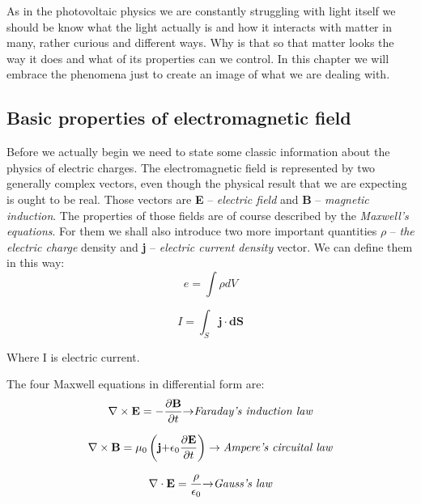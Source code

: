 As in the photovoltaic physics we are constantly struggling with light itself we should be know what the light actually is and how it interacts with matter in many, rather curious and different ways. Why is that so that matter looks the way it does and what of its properties can we control. In this chapter we will embrace the phenomena just to create an image of what we are dealing with. 

\subsection{Basic properties of electromagnetic field}

Before we actually begin we need to state some classic information about
the physics of electric charges. The electromagnetic field is
represented by two generally complex vectors, even though the physical
result that we are expecting is ought to be real. Those vectors are
\textbf{E} -- \emph{electric field} and \textbf{B} -- \emph{magnetic
induction}. The properties of those fields are of course described by
the \emph{Maxwell's equations}. For them we shall also introduce two
more important quantities \(\rho\) -- \emph{the electric charge} density
and \textbf{j} -- \emph{electric current density} vector.
We can define them in this way:
\begin{equation}
e = \int\rho dV
\end{equation}

\begin{equation}
I = \int_{S}^{}\mathbf{j \cdot dS}
\end{equation}

Where I is electric current.

The four Maxwell equations in differential form are:
\begin{equation}
\nabla \times \mathbf{E} = -\frac{\partial\mathbf{B}}{\partial t}\mathbf{\rightarrow}
\emph{Faraday's induction law}
\end{equation}

\begin{equation}
\nabla \times \mathbf{B}=\mu_{0}\left( \mathbf{j +}\epsilon_{0}\frac{\partial\mathbf{E}}{\partial t} \right) \rightarrow
\emph{Ampere's circuital law}
\end{equation}

\begin{equation}
\nabla \cdot \mathbf{E}=\frac{\rho}{\epsilon_{0}}\mathbf{\rightarrow}
\emph{Gauss's law}
\end{equation}

